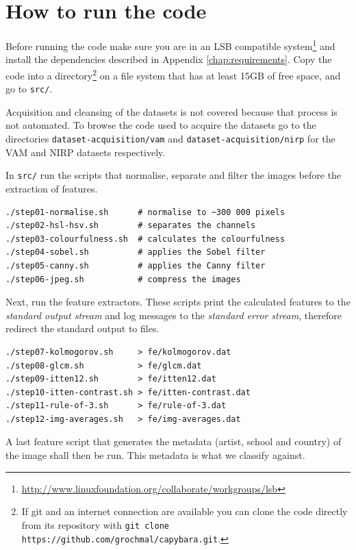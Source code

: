 \documentclass[11pt,a4paper,twoside,openright]{report}
\begin{document}
\clearpage{\pagestyle{empty}\cleardoublepage}
\chapter{How to run the code}
\label{chap:runthecode}

Before running the code make sure you are in an LSB compatible system\footnote{
\href{http://www.linuxfoundation.org/collaborate/workgroups/lsb}
{http://www.linuxfoundation.org/collaborate/workgroups/lsb}} and install the
dependencies described in Appendix \ref{chap:requirements}.  Copy the code into
a directory\footnote{If git and an internet connection are available you can
clone the code directly from its repository with
\verb|git clone https://github.com/grochmal/capybara.git|.} on a file system
that has at least 15GB of free space, and go to \texttt{src/}.

Acquisition and cleansing of the datasets is not covered because that process
is not automated.  To browse the code used to acquire the datasets go to the
directories \texttt{dataset-acquisition/vam} and
\texttt{dataset-acquisition/nirp} for the VAM and NIRP datasets respectively.

In \texttt{src/} run the scripts that normalise, separate and filter the images
before the extraction of features.

\begin{Verbatim}[frame=leftline]
./step01-normalise.sh      # normalise to ~300 000 pixels
./step02-hsl-hsv.sh        # separates the channels
./step03-colourfulness.sh  # calculates the colourfulness
./step04-sobel.sh          # applies the Sobel filter
./step05-canny.sh          # applies the Canny filter
./step06-jpeg.sh           # compress the images
\end{Verbatim}

Next, run the feature extractors.  These scripts print the calculated features
to the \emph{standard output stream} and log messages to the \emph{standard
error stream}, therefore redirect the standard output to files.

\begin{Verbatim}[frame=leftline]
./step07-kolmogorov.sh     > fe/kolmogorov.dat
./step08-glcm.sh           > fe/glcm.dat
./step09-itten12.sh        > fe/itten12.dat
./step10-itten-contrast.sh > fe/itten-contrast.dat
./step11-rule-of-3.sh      > fe/rule-of-3.dat
./step12-img-averages.sh   > fe/img-averages.dat
\end{Verbatim}

A last feature script that generates the metadata (artist, school and country)
of the image shall then be run.  This metadata is what we classify against.
\end{document}
